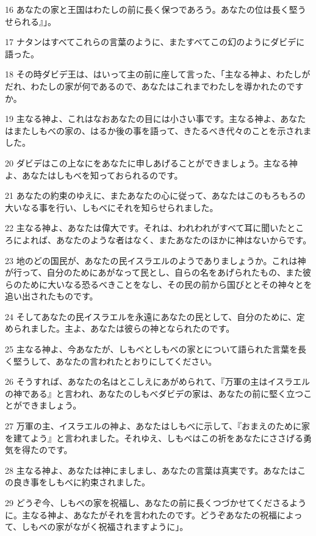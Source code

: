 \par 16 あなたの家と王国はわたしの前に長く保つであろう。あなたの位は長く堅うせられる』」。
\par 17 ナタンはすべてこれらの言葉のように、またすべてこの幻のようにダビデに語った。
\par 18 その時ダビデ王は、はいって主の前に座して言った、「主なる神よ、わたしがだれ、わたしの家が何であるので、あなたはこれまでわたしを導かれたのですか。
\par 19 主なる神よ、これはなおあなたの目には小さい事です。主なる神よ、あなたはまたしもべの家の、はるか後の事を語って、きたるべき代々のことを示されました。
\par 20 ダビデはこの上なにをあなたに申しあげることができましょう。主なる神よ、あなたはしもべを知っておられるのです。
\par 21 あなたの約束のゆえに、またあなたの心に従って、あなたはこのもろもろの大いなる事を行い、しもべにそれを知らせられました。
\par 22 主なる神よ、あなたは偉大です。それは、われわれがすべて耳に聞いたところによれば、あなたのような者はなく、またあなたのほかに神はないからです。
\par 23 地のどの国民が、あなたの民イスラエルのようでありましょうか。これは神が行って、自分のためにあがなって民とし、自らの名をあげられたもの、また彼らのために大いなる恐るべきことをなし、その民の前から国びととその神々とを追い出されたものです。
\par 24 そしてあなたの民イスラエルを永遠にあなたの民として、自分のために、定められました。主よ、あなたは彼らの神となられたのです。
\par 25 主なる神よ、今あなたが、しもべとしもべの家とについて語られた言葉を長く堅うして、あなたの言われたとおりにしてください。
\par 26 そうすれば、あなたの名はとこしえにあがめられて、『万軍の主はイスラエルの神である』と言われ、あなたのしもべダビデの家は、あなたの前に堅く立つことができましょう。
\par 27 万軍の主、イスラエルの神よ、あなたはしもべに示して、『おまえのために家を建てよう』と言われました。それゆえ、しもべはこの祈をあなたにささげる勇気を得たのです。
\par 28 主なる神よ、あなたは神にましまし、あなたの言葉は真実です。あなたはこの良き事をしもべに約束されました。
\par 29 どうぞ今、しもべの家を祝福し、あなたの前に長くつづかせてくださるように。主なる神よ、あなたがそれを言われたのです。どうぞあなたの祝福によって、しもべの家がながく祝福されますように」。

